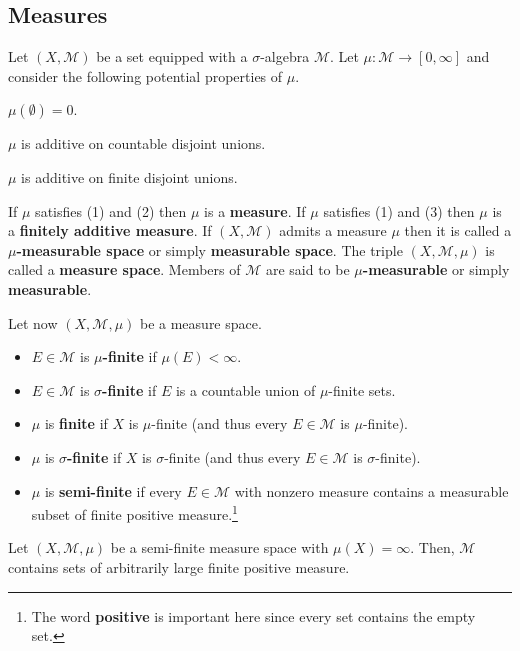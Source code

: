 \documentclass[11pt]{article}
\newcommand{\M}{\mathcal{M}}
\begin{document}
\subsection{Measures}
\begin{definition}
Let $(X,\M)$ be a set equipped with a $\sigma$-algebra $\M$. Let $\mu: \M\to[0,\infty]$ and consider the following potential properties of $\mu$.
\begin{enum}{\arabic}
\item $\mu(\emptyset)=0$.
\item $\mu$ is additive on countable disjoint unions.
\item $\mu$ is additive on finite disjoint unions.
\end{enum}
If $\mu$ satisfies \textup{(1)} and \textup{(2)} then $\mu$ is a \textbf{measure}. If $\mu$ satisfies \textup{(1)} and \textup{(3)} then $\mu$ is a \textbf{finitely additive measure}. If $(X,\M)$ admits a measure $\mu$ then it is called a \textbf{$\mu$-measurable space} or simply \textbf{measurable space}. The triple $(X,\M,\mu)$ is called a \textbf{measure space}. Members of $\M$ are said to be \textbf{$\mu$-measurable} or simply \textbf{measurable}.

Let now $(X,\M,\mu)$ be a measure space. 
\begin{itemize}
\item $E\in\M$ is \textbf{$\mu$-finite} if $\mu(E)<\infty$.
\item $E\in\M$ is \textbf{$\sigma$-finite} if $E$ is a countable union of $\mu$-finite sets.
\item $\mu$ is \textbf{finite} if $X$ is $\mu$-finite (and thus every $E\in\M$ is $\mu$-finite).
\item $\mu$ is \textbf{$\sigma$-finite} if $X$ is $\sigma$-finite (and thus every $E\in\M$ is $\sigma$-finite).
\item $\mu$ is \textbf{semi-finite} if every $E\in\M$ with nonzero measure contains a measurable subset of finite positive measure.\footnote{The word \textbf{positive} is important here since every set contains the empty set.}
\end{itemize}
\end{definition}

\begin{proposition}
Let $(X,\M,\mu)$ be a semi-finite measure space with $\mu(X)=\infty$. Then, $\M$ contains sets of arbitrarily large finite positive measure.
\end{proposition}
\end{document}

